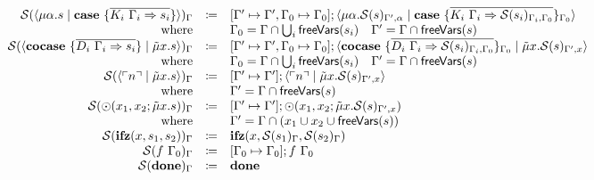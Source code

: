 \[\begin{array}{rcll}
    \substruct{\cut{\mu\alpha.s}{\case{\overline{K_i\ \Gamma_i \Rightarrow s_i}}}}{\Gamma} & \coloneq & \substitute{\Gamma' \mapsto \Gamma', \Gamma_0 \mapsto \Gamma_0}{\cut{\mu\alpha.\substruct{s}{\Gamma', \alpha}}{\case{\overline{K_i\ \Gamma_i \Rightarrow \substruct{s_i}{\Gamma_i, \Gamma_0}}}_{\Gamma_0}}} & \\
    \text{where} &  & \Gamma_0 = \Gamma \cap \bigcup_i \free{s_i}  \quad  \Gamma' = \Gamma \cap \free{s} & \\
    \substruct{\cut{\cocase{\overline{D_i\ \Gamma_i \Rightarrow s_i}}}{\tilde{\mu}x.s}}{\Gamma} & \coloneq & \substitute{\Gamma' \mapsto \Gamma', \Gamma_0 \mapsto \Gamma_0}{\cut{\cocase{\overline{D_i\ \Gamma_i \Rightarrow \substruct{s_i}{\Gamma_i, \Gamma_0}}}_{\Gamma_0}}{\tilde{\mu}x.\substruct{s}{\Gamma', x}}} & \\
    \text{where} &  & \Gamma_0 = \Gamma \cap \bigcup_i \free{s_i}  \quad  \Gamma' = \Gamma \cap \free{s} & \\
    \substruct{\cut{\lit{n}}{\tilde{\mu}x.s}}{\Gamma} & \coloneq & \substitute{\Gamma' \mapsto \Gamma'}{\cut{\lit{n}}{\tilde{\mu}x.\substruct{s}{\Gamma', x}}} & \\
    \text{where} &  & \Gamma' = \Gamma \cap \free{s} & \\
    \substruct{\odot(x_1, x_2; \tilde{\mu}x.s)}{\Gamma} & \coloneq & \substitute{\Gamma' \mapsto \Gamma'}{\odot(x_1, x_2; \tilde{\mu}x.\substruct{s}{\Gamma', x})} & \\
    \text{where} &  & \Gamma' = \Gamma \cap (x_1 \cup x_2 \cup \free{s}) & \\
    \substruct{\ifz{x}{s_1}{s_2}}{\Gamma}{} & \coloneq & \ifz{x}{\substruct{s_1}{\Gamma}}{\substruct{s_2}{\Gamma}} & \\
    \substruct{f\ \Gamma_0}{\Gamma} & \coloneq & \substitute{\Gamma_0 \mapsto \Gamma_0}{f\ \Gamma_0} & \\
    \substruct{\done}{\Gamma} & \coloneq & \done & \\
  \end{array}
\]

